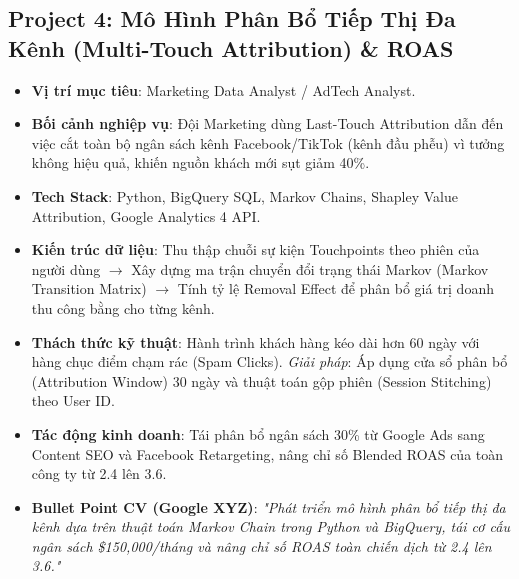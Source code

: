 \subsection{Project 4: Mô Hình Phân Bổ Tiếp Thị Đa Kênh (Multi-Touch Attribution) \& ROAS}
\begin{itemize}
    \item \textbf{Vị trí mục tiêu}: Marketing Data Analyst / AdTech Analyst.
    \item \textbf{Bối cảnh nghiệp vụ}: Đội Marketing dùng Last-Touch Attribution dẫn đến việc cắt toàn bộ ngân sách kênh Facebook/TikTok (kênh đầu phễu) vì tưởng không hiệu quả, khiến nguồn khách mới sụt giảm 40\%.
    \item \textbf{Tech Stack}: Python, BigQuery SQL, Markov Chains, Shapley Value Attribution, Google Analytics 4 API.
    \item \textbf{Kiến trúc dữ liệu}: Thu thập chuỗi sự kiện Touchpoints theo phiên của người dùng $\rightarrow$ Xây dựng ma trận chuyển đổi trạng thái Markov (Markov Transition Matrix) $\rightarrow$ Tính tỷ lệ Removal Effect để phân bổ giá trị doanh thu công bằng cho từng kênh.
    \item \textbf{Thách thức kỹ thuật}: Hành trình khách hàng kéo dài hơn 60 ngày với hàng chục điểm chạm rác (Spam Clicks). \textit{Giải pháp}: Áp dụng cửa sổ phân bổ (Attribution Window) 30 ngày và thuật toán gộp phiên (Session Stitching) theo User ID.
    \item \textbf{Tác động kinh doanh}: Tái phân bổ ngân sách 30\% từ Google Ads sang Content SEO và Facebook Retargeting, nâng chỉ số Blended ROAS của toàn công ty từ 2.4 lên 3.6.
    \item \textbf{Bullet Point CV (Google XYZ)}: \textit{"Phát triển mô hình phân bổ tiếp thị đa kênh dựa trên thuật toán Markov Chain trong Python và BigQuery, tái cơ cấu ngân sách \$150,000/tháng và nâng chỉ số ROAS toàn chiến dịch từ 2.4 lên 3.6."}
\end{itemize}

